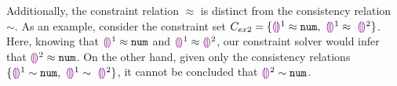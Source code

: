 
Additionally, the constraint relation $\approx$ is distinct from the consistency relation $\sim$. As an example, consider the constraint set $C_{ex2} = \{ \tehole^{1} \approx \tnum, ~ \tehole^{1} \approx~ \tehole^{2}\}$. Here, knowing that $\tehole^{1} \approx \tnum$ and $\tehole^{1} \approx \tehole^{2}$, our constraint solver would infer that $\tehole^{2} \approx \tnum$. On the other hand, given only the consistency relations $\{ \tehole^{1} \sim \tnum, ~ \tehole^{1} \sim~ \tehole^{2}\}$, it cannot be concluded that $ \tehole^{2} \sim \tnum$.

